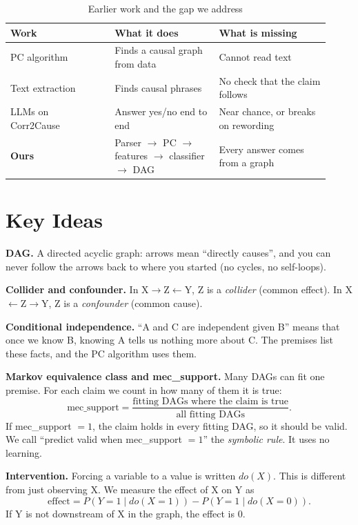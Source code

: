 \documentclass[conference]{IEEEtran}
\begin{document}
\begin{table}[t]
\centering
\caption{Earlier work and the gap we address}
\label{tab:lit}
\footnotesize
\setlength{\tabcolsep}{3pt}
\begin{tabular}{p{0.30\linewidth}p{0.30\linewidth}p{0.32\linewidth}}
\toprule
Work & What it does & What is missing \\
\midrule
PC algorithm~\cite{spirtes2000} & Finds a causal graph from data & Cannot read text \\
Text extraction~\cite{khoo2000,hendrickx2010,dunietz2017} & Finds causal phrases & No check that the claim follows \\
LLMs on Corr2Cause~\cite{jin2024} & Answer yes/no end to end & Near chance, or breaks on rewording \\
\textbf{Ours} & Parser $\to$ PC $\to$ features $\to$ classifier $\to$ DAG & Every answer comes from a graph \\
\bottomrule
\end{tabular}
\end{table}

\section{Key Ideas}
\textbf{DAG.} A directed acyclic graph: arrows mean ``directly causes'', and you can never follow the arrows back
to where you started (no cycles, no self-loops).

\textbf{Collider and confounder.} In X$\to$Z$\leftarrow$Y, Z is a \emph{collider} (common effect). In
X$\leftarrow$Z$\to$Y, Z is a \emph{confounder} (common cause).

\textbf{Conditional independence.} ``A and C are independent given B'' means that once we know B, knowing A tells
us nothing more about C. The premises list these facts, and the PC algorithm uses them.

\textbf{Markov equivalence class and mec\_support.} Many DAGs can fit one premise. For each claim we count in how
many of them it is true:
\begin{equation}
\text{mec\_support} = \frac{\text{fitting DAGs where the claim is true}}{\text{all fitting DAGs}}.
\label{eq:mec}
\end{equation}
If mec\_support $=1$, the claim holds in every fitting DAG, so it should be valid. We call ``predict valid when
mec\_support $=1$'' the \emph{symbolic rule}. It uses no learning.

\textbf{Intervention.} Forcing a variable to a value is written $do(X)$. This is different from just observing X.
We measure the effect of X on Y as
\begin{equation}
\text{effect} = P(Y{=}1 \mid do(X{=}1)) - P(Y{=}1 \mid do(X{=}0)).
\label{eq:effect}
\end{equation}
If Y is not downstream of X in the graph, the effect is 0.
\end{document}
